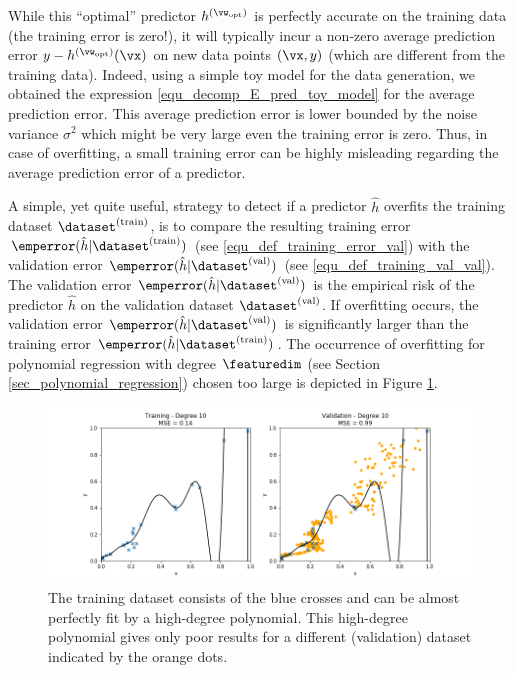 \documentclass[12pt]{report}
\begin{document}
While this ``optimal'' predictor $h^{(\vw_{\rm opt})}$ is perfectly accurate on the training 
data (the training error is zero!), it will typically incur a non-zero average prediction error 
$y - h^{(\vw_{\rm opt})}(\vx)$ on new data points $(\vx,y)$ (which are different from the 
training data). Indeed, using a simple toy model for the data generation, we obtained the 
expression \eqref{equ_decomp_E_pred_toy_model} for the average prediction error. This 
average prediction error is lower bounded by the noise variance $\sigma^{2}$ which might 
be very large even the training error is zero. Thus, in case of overfitting, a small training 
error can be highly misleading regarding the average prediction error of a predictor. 

A simple, yet quite useful, strategy to detect if a predictor $\hat{h}$ overfits the training 
dataset $\dataset^{(\rm train)}$, is to compare the resulting training error 
$\emperror(\hat{h}| \dataset^{(\rm train)})$ (see \eqref{equ_def_training_error_val}) with the 
validation error $\emperror(\hat{h}| \dataset^{(\rm val)})$ (see \eqref{equ_def_training_val_val}). 
The validation error $\emperror(\hat{h}| \dataset^{(\rm val)})$ is the empirical risk of the predictor 
$\hat{h}$ on the validation dataset $\dataset^{(\rm val)}$. If overfitting occurs, the validation 
error $\emperror(\hat{h}| \dataset^{(\rm val)})$ is significantly larger than the training error 
$\emperror(\hat{h}| \dataset^{(\rm train)})$. The occurrence of overfitting for polynomial regression with 
degree $\featuredim$ (see Section \ref{sec_polynomial_regression}) chosen too large is depicted in 
Figure \ref{fig_polyn_training}. 

\begin{figure}[htbp]
	\centering
	\includegraphics[width=\textwidth]{OverfittedPolyn.png}  
	\caption{The training dataset consists of the blue crosses and can be almost perfectly 
		fit by a high-degree polynomial. This high-degree polynomial gives only poor results 
		for a different (validation) dataset indicated by the orange dots.}
	\label{fig_polyn_training}
\end{figure}
\end{document}
